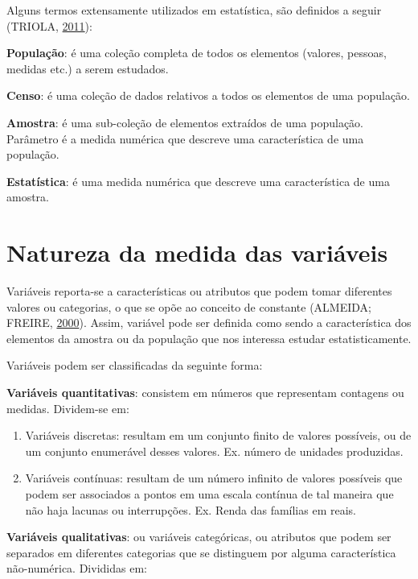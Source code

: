 \documentclass[12pt,brazil,oneside]{book}
\begin{document}
Alguns termos extensamente utilizados em estatística, são definidos a
seguir (TRIOLA, \protect\hyperlink{ref-triola1999}{2011}):

\textbf{População}: é uma coleção completa de todos os elementos
(valores, pessoas, medidas etc.) a serem estudados.

\textbf{Censo}: é uma coleção de dados relativos a todos os elementos de
uma população.

\textbf{Amostra}: é uma sub-coleção de elementos extraídos de uma
população. Parâmetro é a medida numérica que descreve uma característica
de uma população.

\textbf{Estatística}: é uma medida numérica que descreve uma
característica de uma amostra.

\hypertarget{natureza-da-medida-das-variaveis}{%
\section{Natureza da medida das
variáveis}\label{natureza-da-medida-das-variaveis}}

Variáveis reporta-se a características ou atributos que podem tomar
diferentes valores ou categorias, o que se opõe ao conceito de constante
(ALMEIDA; FREIRE, \protect\hyperlink{ref-almeida2000}{2000}). Assim,
variável pode ser definida como sendo a característica dos elementos da
amostra ou da população que nos interessa estudar estatisticamente.

Variáveis podem ser classificadas da seguinte forma:

\textbf{Variáveis quantitativas}: consistem em números que representam
contagens ou medidas. Dividem-se em:

\begin{enumerate}
\def\labelenumi{\alph{enumi})}
\item
  Variáveis discretas: resultam em um conjunto finito de valores
  possíveis, ou de um conjunto enumerável desses valores. Ex. número de
  unidades produzidas.
\item
  Variáveis contínuas: resultam de um número infinito de valores
  possíveis que podem ser associados a pontos em uma escala contínua de
  tal maneira que não haja lacunas ou interrupções. Ex. Renda das
  famílias em reais.
\end{enumerate}

\textbf{Variáveis qualitativas}: ou variáveis categóricas, ou atributos
que podem ser separados em diferentes categorias que se distinguem por
alguma característica não-numérica. Divididas em:
\end{document}
